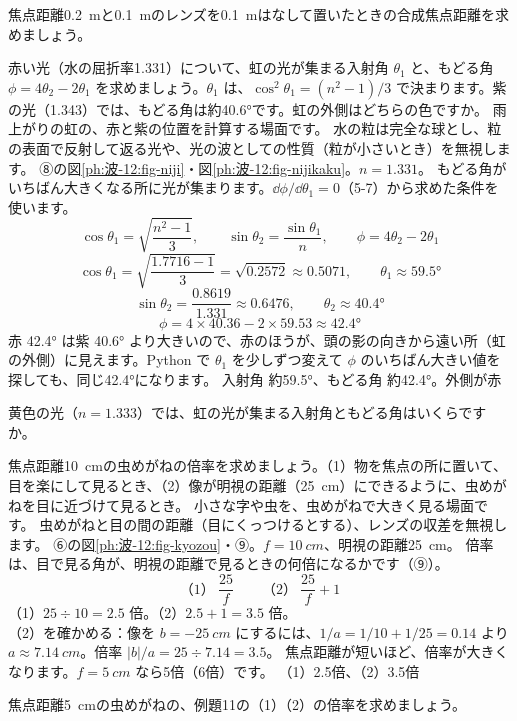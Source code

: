 \begin{jibun}
焦点距離\qty{0.2}{m}と\qty{0.1}{m}のレンズを\qty{0.1}{m}はなして置いたときの合成焦点距離を求めましょう。
\end{jibun}

\label{ph:波-12:ex10}
\begin{phreidai}[虹の角]
赤い光（水の屈折率1.331）について、虹の光が集まる入射角 $\theta_1$ と、もどる角 $\phi=4\theta_2-2\theta_1$ を求めましょう。$\theta_1$ は、$\cos^2\theta_1=(n^2-1)/3$ で決まります。紫の光（1.343）では、もどる角は約\ang{40.6}です。虹の外側はどちらの色ですか。
\phbamen
雨上がりの虹の、赤と紫の位置を計算する場面です。
\phmushi
水の粒は完全な球とし、粒の表面で反射して返る光や、光の波としての性質（粒が小さいとき）を無視します。
\phzu
⑧の図\ref{ph:波-12:fig-niji}・図\ref{ph:波-12:fig-nijikaku}。$n=1.331$。
\phriyu
もどる角がいちばん大きくなる所に光が集まります。$\dd\phi/\dd\theta_1=0$（5-7）から求めた条件を使います。
\phtateru
\[\cos\theta_1=\sqrt{\frac{n^2-1}{3}},\qquad\sin\theta_2=\frac{\sin\theta_1}{n},\qquad\phi=4\theta_2-2\theta_1\]
\phtoku
\[\cos\theta_1=\sqrt{\frac{1.7716-1}{3}}=\sqrt{0.2572}\approx0.5071,\qquad\theta_1\approx\ang{59.5}\]
\[\sin\theta_2=\frac{0.8619}{1.331}\approx0.6476,\qquad\theta_2\approx\ang{40.4}\]
\[\phi=4\times40.36-2\times59.53\approx\ang{42.4}\]
\phtashikame
赤 \ang{42.4} は紫 \ang{40.6} より大きいので、赤のほうが、頭の影の向きから遠い所（虹の外側）に見えます。Python で $\theta_1$ を少しずつ変えて $\phi$ のいちばん大きい値を探しても、同じ\ang{42.4}になります。
\kotae 入射角 約\ang{59.5}、もどる角 約\ang{42.4}。外側が赤
\end{phreidai}
\begin{jibun}
黄色の光（$n=1.333$）では、虹の光が集まる入射角ともどる角はいくらですか。
\end{jibun}

\label{ph:波-12:ex11}
\begin{phreidai}[虫めがねの倍率]
焦点距離\qty{10}{cm}の虫めがねの倍率を求めましょう。（1）物を焦点の所に置いて、目を楽にして見るとき、（2）像が明視の距離（\qty{25}{cm}）にできるように、虫めがねを目に近づけて見るとき。
\phbamen
小さな字や虫を、虫めがねで大きく見る場面です。
\phmushi
虫めがねと目の間の距離（目にくっつけるとする）、レンズの収差を無視します。
\phzu
⑥の図\ref{ph:波-12:fig-kyozou}・⑨。$f=\qty{10}{cm}$、明視の距離\qty{25}{cm}。
\phriyu
倍率は、目で見る角が、明視の距離で見るときの何倍になるかです（⑨）。
\phtateru
\[（1）\ \frac{25}{f}\qquad（2）\ \frac{25}{f}+1\]
\phtoku
（1）$25\div10=2.5$ 倍。（2）$2.5+1=3.5$ 倍。\\
（2）を確かめる：像を $b=\qty{-25}{cm}$ にするには、$1/a=1/10+1/25=0.14$ より $a\approx\qty{7.14}{cm}$。倍率 $|b|/a=25\div7.14=3.5$。
\phtashikame
焦点距離が短いほど、倍率が大きくなります。$f=\qty{5}{cm}$ なら5倍（6倍）です。
\kotae （1）2.5倍、（2）3.5倍
\end{phreidai}
\begin{jibun}
焦点距離\qty{5}{cm}の虫めがねの、例題11の（1）（2）の倍率を求めましょう。
\end{jibun}

